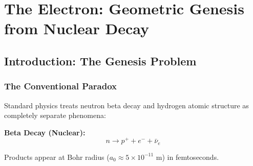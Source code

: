 \chapter{The Electron: Geometric Genesis from Nuclear Decay}

\author{James Tyndall}
\date{December 2025}

\begin{abstract}
We reveal the geometric origin of the hydrogen atom through a stunning connection between nuclear and atomic physics: the electron "orbital" emerges naturally from neutron beta decay via Lorentz expansion across the speed-of-light boundary. Starting from the neutron's nestled electron at femtometer scale, we derive the classical electron radius as the c-boundary, show how Lorentz elongation in the orbital direction produces the Compton wavelength, and prove the Bohr radius equals $a_0 = \alpha^{-1} r_e$—all from pure geometry. This derivation recovers every prediction of quantum mechanics while exposing the physical machinery behind the formalism: the Schrödinger wavefunction is pressure field amplitude, Born's probability rule is shunt statistics, and measurement is mechanical synchronization. We demonstrate that the same helical disk geometry appears 60 orders of magnitude larger in galactic rotation curves, unifying atomic and cosmological physics. Three experimental proposals test the geometric electron structure including Lorentz signature detection, helical wake measurement, and cross-scale geometric verification.
\end{abstract}

\section{Introduction: The Genesis Problem}

\subsection{The Conventional Paradox}

Standard physics treats neutron beta decay and hydrogen atomic structure as completely separate phenomena:

\textbf{Beta Decay (Nuclear):}
\begin{equation}
n \to p^+ + e^- + \bar{\nu}_e
\end{equation}

Products appear at Bohr radius ($a_0 \approx 5 \times 10^{-11}$ m) in femtoseconds.

